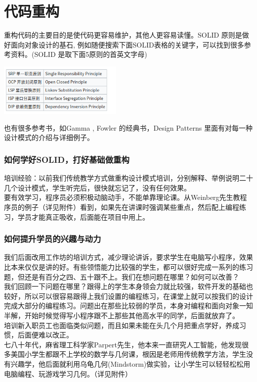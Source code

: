 \chapter{代码重构} %

重构代码的主要目的是使代码更容易维护，其他人更容易读懂。SOLID
原则是做好面向对象设计的基石,
例如随便搜索下面SOLID表格的关键字，可以找到很多参考资料。(SOLID
是取下面5原则的首英文字母)


\includegraphics[width=6cm]{Screenshotfrom2022-12-2822-14-39.png}

也有很多参考书，如Gamma , Fowler 的经典书，Design Patterns
里面有对每一种设计模式的介绍与详细例子。

\hypertarget{ux5982ux4f55ux5b66ux597dsolidux6253ux597dux57faux7840ux505aux91cdux6784}{%
\subsection{如何学好SOLID，打好基础做重构}\label{ux5982ux4f55ux5b66ux597dsolidux6253ux597dux57faux7840ux505aux91cdux6784}}

培训经验：以前我们传统教学方式做重构设计模式培训，分别解释、举例说明二十几个设计模式，学生听完后，很快就忘记了，没有任何效果。\\
要有效学习，程序员必须积极动脑动手，不能单靠理论课。从Weinberg先生教程序员的例子（详见附件）看到，如果先在讲课时强调某些重点，然后配上编程练习，学员才能真正吸收，后面能在项目中用上。

\hypertarget{ux5982ux4f55ux63d0ux5347ux5b66ux5458ux7684ux5174ux8da3ux4e0eux52a8ux529b}{%
\subsection{如何提升学员的兴趣与动力}\label{ux5982ux4f55ux63d0ux5347ux5b66ux5458ux7684ux5174ux8da3ux4e0eux52a8ux529b}}

我们后面改用工作坊的培训方式，减少理论讲诉，要求学生在电脑写小程序，效果比本来仅仅是讲的好。有些领悟能力比较强的学生，都可以很好完成一系列的练习题，但还是有百分之四、五十跟不上。我们在想问题在哪里？如何可以改善？\\
我们回顾一下问题在哪里？跟得上的学生本身领会力就比较强，软件开发的基础也较好，所以可以很容易跟得上我们设置的编程练习，在课堂上就可以按我们的设计完成大部分的编程练习。问题出在那些比较弱的学员，本身对编程和面向对象一知半解，开始时候觉得写小程序跟不上那些其他高水平的同学，后面就放弃了。\\
培训新入职员工也面临类似问题，而且如果未能在头几个月把重点学好，养成习惯，后面便难以改正。\\
七八十年代，麻省理工科学家Parpert先生，他本来一直研究人工智能，他发现很多美国小学生都跟不上学校的数学与几何课，根因是老师用传统教学方法，学生没有兴趣学，他后面就利用乌龟几何(Mindstorm)做实验，让小学生可以轻轻松松用电脑编程、玩游戏学习几何。（详见附件）

